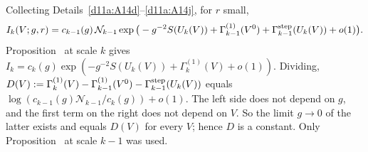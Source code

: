 \begin{detail}\label{d11a:A14k}
Collecting Details~\ref{d11a:A14d}--\ref{d11a:A14j}, for $r$ small,
\[
I_k(V;g,r)=c_{k-1}(g)\,\mathcal N_{k-1}\exp\big(-g^{-2}S(U_k(V))+\Gamma^{(1)}_{k-1}(V^0)+\Gamma^{\rm step}_{k-1}(U_k(V))+o(1)\big).
\]
Proposition~ at scale $k$ gives $I_k=c_k(g)\exp(-g^{-2}S(U_k(V))+\Gamma^{(1)}_k(V)+o(1))$. Dividing, $D(V):=\Gamma^{(1)}_k(V)-\Gamma^{(1)}_{k-1}(V^0)-\Gamma^{\rm step}_{k-1}(U_k(V))$ equals $\log(c_{k-1}(g)\mathcal N_{k-1}/c_k(g))+o(1)$. The left side does not depend on $g$, and the first term on the right does not depend on $V$. So the limit $g\to0$ of the latter exists and equals $D(V)$ for every $V$; hence $D$ is a constant. Only Proposition~ at scale $k-1$ was used.
\end{detail}


